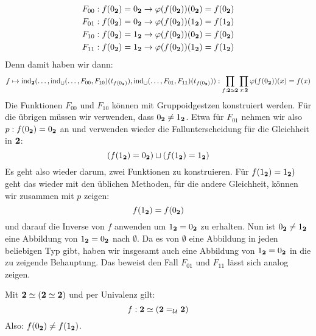 \begin{beweis}
\begin{align*}
    F_{00}& : f(0_{\mathbf{2}})=0_{\mathbf{2}} \to \varphi(f(0_{\mathbf{2}}))(0_{\mathbf{2}})=f(0_{\mathbf{2}}) \\
    F_{01}& : f(0_{\mathbf{2}})=0_{\mathbf{2}} \to \varphi(f(0_{\mathbf{2}}))(1_{\mathbf{2}})=f(1_{\mathbf{2}}) \\
    F_{10}& : f(0_{\mathbf{2}})=1_{\mathbf{2}} \to  \varphi(f(0_{\mathbf{2}}))(0_{\mathbf{2}})=f(0_{\mathbf{2}}) \\
    F_{11}& : f(0_{\mathbf{2}})=1_{\mathbf{2}} \to  \varphi(f(0_{\mathbf{2}}))(1_{\mathbf{2}})=f(1_{\mathbf{2}})
  \end{align*}
  Denn damit haben wir dann:
  \[
    f\mapsto \mathrm{ind}_{\mathbf{2}}(\dots,\mathrm{ind}_{\sqcup}(\dots,F_{00},F_{10})(t_{f(0_{\mathbf{2}})}),\mathrm{ind}_{\sqcup}(\dots,F_{01},F_{11})(t_{f(0_{\mathbf{2}})})): \prod_{f:\mathbf{2}\simeq \mathbf{2}}\prod_{x:\mathbf{2}} \varphi(f(0_{\mathbf{2}}))(x)=f(x)
  \]
  Die Funktionen $F_{00}$ und $F_{10}$ können mit Gruppoidgestzen konstruiert werden.
  Für die übrigen müssen wir verwenden, dass $0_{\mathbf{2}}\not=1_{\mathbf{2}}$.
  Etwa für $F_{01}$ nehmen wir also $p:f(0_{\mathbf{2}})=0_{\mathbf{2}}$ an und verwenden wieder die Fallunterscheidung für die Gleichheit in $\mathbf{2}$:
  \[
    (f(1_{\mathbf{2}})=0_{\mathbf{2}})\sqcup(f(1_{\mathbf{2}})=1_{\mathbf{2}})
  \]
  Es geht also wieder darum, zwei Funktionen zu konstruieren. Für $f(1_{\mathbf{2}})=1_{\mathbf{2}})$ geht das wieder mit den üblichen Methoden, für die andere Gleichheit, können wir zusammen mit $p$ zeigen:
  \[
    f(1_{\mathbf{2}})=f(0_{\mathbf{2}})
  \]
  und darauf die Inverse von $f$ anwenden um $1_{\mathbf{2}}=0_{\mathbf{2}}$ zu erhalten. Nun ist $0_{\mathbf{2}}\not=1_{\mathbf{2}}$ eine Abbildung von $1_{\mathbf{2}}=0_{\mathbf{2}}$ nach $\emptyset$.
  Da es von $\emptyset$ eine Abbildung in jeden beliebigen Typ gibt, haben wir insgesamt auch eine Abbildung von $1_{\mathbf{2}}=0_{\mathbf{2}}$ in die zu zeigende Behauptung.
  Das beweist den Fall $F_{01}$ und $F_{11}$ lässt sich analog zeigen.
\end{beweis}

\begin{beispiel}
  Mit $\mathbf{2}\simeq(\mathbf{2}\simeq\mathbf{2})$ und per Univalenz gilt:
  \[
    f:\mathbf{2}\simeq (\mathbf{2}=_{\mathcal{U}}\mathbf{2})
  \]
  Also: $f(0_{\mathbf{2}})\not=f(1_{\mathbf{2}})$.
\end{beispiel}


